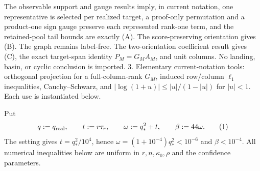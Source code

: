 The observable support and gauge results imply, in current notation,
   one representative is selected per realized target, a proof-only
   permutation and a product-one sign gauge preserve each represented
   rank-one term, and the retained-pool tail bounds are exactly (A). The
   score-preserving orientation gives (B). The graph remains label-free.
The two-orientation coefficient result gives (C), the exact target-span identity
   $P_M=G_MA_M$, and unit columns. No landing, basin, or cyclic conclusion is
   imported.
3. Elementary current-notation tools: orthogonal projection for a
   full-column-rank $G_M$, induced row/column $\ell_1$ inequalities,
   Cauchy--Schwarz, and
   $|\log(1+u)|\le |u|/(1-|u|)$ for $|u|<1$. Each use is instantiated below.

Put
\[
 q:=q_{\rm real},\qquad t:=r\tau_r,\qquad
 \omega:=q_*^2+t,\qquad \beta:=44\omega. \tag{1}
\]
The setting gives $t=q_*^2/10^4$, hence
$\omega=(1+10^{-4})q_*^2<10^{-6}$ and $\beta<10^{-4}$. All numerical
inequalities below are uniform in $r,n,\kappa_0,\rho$ and the confidence
parameters.


